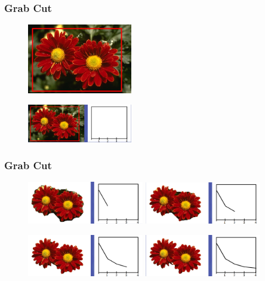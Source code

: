 \documentclass[notheorems,mathserif,table,compress]{beamer}  %
\begin{document}
\begin{frame}
\frametitle{Grab Cut}
\begin{figure}[!ht]
    \centering
    \includegraphics[width=1.8in]{grabcut1.png}
    \end{figure}
    \begin{figure}[!ht]
    \centering
    \includegraphics[width=1.8in]{grab1.png}
    \end{figure}
\end{frame}

\begin{frame}
\frametitle{Grab Cut}
    \begin{figure}[!ht]
    \begin{minipage}[t]{0.45\linewidth}
    \centering
    \includegraphics[width=2.0in]{grab2.png}
    \end{minipage}
    \begin{minipage}[t]{0.45\linewidth}
    \centering
    \includegraphics[width=2.0in]{grab3.png}
    \end{minipage}
    \end{figure}
    \begin{figure}[!ht]
    \begin{minipage}[t]{0.45\linewidth}
    \centering
    \includegraphics[width=2.0in]{grab4.png}
    \end{minipage}
    \begin{minipage}[t]{0.45\linewidth}
    \centering
    \includegraphics[width=2.0in]{grab5.png}
    \end{minipage}
    \end{figure}
\end{frame}
\end{document}

